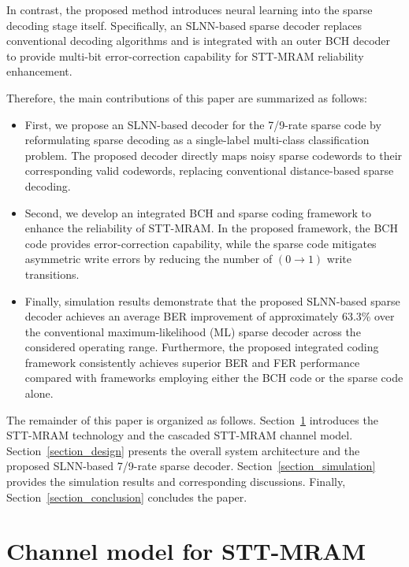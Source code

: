 \documentclass[conference]{IEEEtran}
\begin{document}
In contrast, the proposed method introduces neural learning into the sparse decoding stage itself. Specifically, an SLNN-based sparse decoder replaces conventional decoding algorithms and is integrated with an outer BCH decoder to provide multi-bit error-correction capability for STT-MRAM reliability enhancement. 





Therefore, the main contributions of this paper are summarized as follows:
\begin{itemize}
    \item First, we propose an SLNN-based decoder for the 7/9-rate sparse code by reformulating sparse decoding as a single-label multi-class classification problem. The proposed decoder directly maps noisy sparse codewords to their corresponding valid codewords, replacing conventional distance-based sparse decoding.
    \item Second, we develop an integrated BCH and sparse coding framework to enhance the reliability of STT-MRAM. In the proposed framework, the BCH code provides error-correction capability, while the sparse code mitigates asymmetric write errors by reducing the number of $(0 \rightarrow 1)$ write transitions.
    \item Finally, simulation results demonstrate that the proposed SLNN-based sparse decoder achieves an average BER improvement of approximately 63.3\% over the conventional maximum-likelihood (ML) sparse decoder across the considered operating range. Furthermore, the proposed integrated coding framework consistently achieves superior BER and FER performance compared with frameworks employing either the BCH code or the sparse code alone.

\end{itemize}

The remainder of this paper is organized as follows. Section~\ref{section_theory} introduces the STT-MRAM technology and the cascaded STT-MRAM channel model. Section~\ref{section_design} presents the overall system architecture and the proposed SLNN-based 7/9-rate sparse decoder. Section~\ref{section_simulation} provides the simulation results and corresponding discussions. Finally, Section~\ref{section_conclusion} concludes the paper.


\section{Channel model for STT-MRAM} \label{section_theory}
\end{document}
